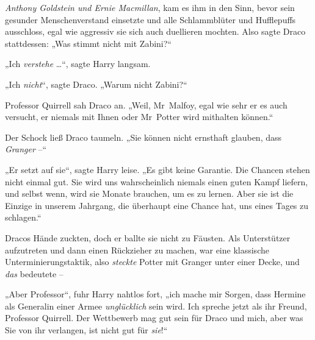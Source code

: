 \emph{Anthony Goldstein und Ernie Macmillan}, kam es ihm in den Sinn, bevor sein gesunder Menschenverstand einsetzte und alle Schlammblüter und Hufflepuffs ausschloss, egal wie aggressiv sie sich auch duellieren mochten. Also sagte Draco stattdessen:
„Was stimmt nicht mit Zabini?“

„Ich \emph{verstehe} …“, sagte Harry langsam.

„Ich \emph{nicht}“, sagte Draco.
„Warum nicht Zabini?“

Professor Quirrell sah Draco an.
„Weil, Mr~Malfoy, egal wie sehr er es auch versucht, er niemals mit Ihnen oder Mr~Potter wird mithalten können.“

Der Schock ließ Draco taumeln.
„Sie können nicht ernsthaft glauben, dass \emph{Granger} –“

„Er setzt auf sie“, sagte Harry leise.
„Es gibt keine Garantie. Die Chancen stehen nicht einmal gut. Sie wird uns wahrscheinlich niemals einen guten Kampf liefern, und selbst wenn, wird sie Monate brauchen, um es zu lernen. Aber sie ist die Einzige in unserem Jahrgang, die überhaupt eine Chance hat, uns eines Tages zu schlagen.“

Dracos Hände zuckten, doch er ballte sie nicht zu Fäusten. Als Unterstützer aufzutreten und dann einen Rückzieher zu machen, war eine klassische Unterminierungstaktik, also \emph{steckte} Potter mit Granger unter einer Decke, und \emph{das} bedeutete –

„Aber Professor“, fuhr Harry nahtlos fort, „ich mache mir Sorgen, dass Hermine als Generalin einer Armee \emph{unglücklich} sein wird. Ich spreche jetzt als ihr Freund, Professor Quirrell. Der Wettbewerb mag gut sein für Draco und mich, aber was Sie von ihr verlangen, ist nicht gut für \emph{sie}!“

